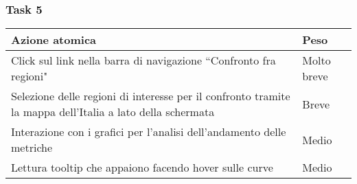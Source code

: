 \subsubsection{Task 5}
\label{sss:iaa-task-4}

{
\renewcommand{\arraystretch}{2}
\begin{longtable}[h]{| p{14cm} | p{2.5cm} |}
    \hline
    \textbf{Azione atomica} & \textbf{Peso} \\
    \hline
    \endhead
    Click sul link nella barra di navigazione ``Confronto fra regioni" & Molto breve \\
    \hline
    Selezione delle regioni di interesse per il confronto tramite la mappa dell'Italia a lato della schermata & Breve \\
    \hline
    Interazione con i grafici per l'analisi dell'andamento delle metriche & Medio \\
    \hline
    Lettura tooltip che appaiono facendo hover sulle curve & Medio \\
    \hline
\end{longtable}
}
